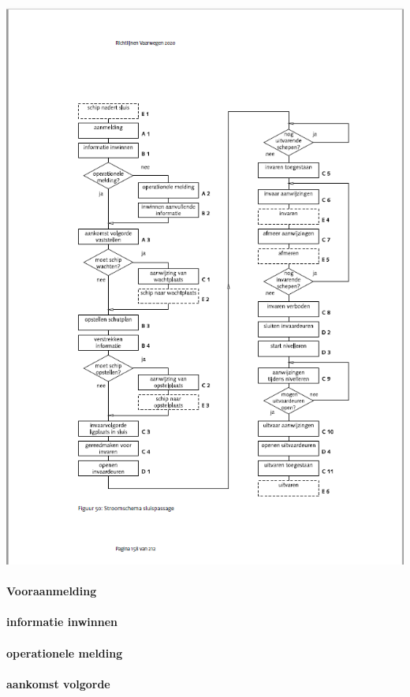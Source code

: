 \includegraphics[scale=0.65]{sluispassage.png}

\paragraph{Vooraanmelding}


\paragraph{informatie inwinnen}


\paragraph{operationele melding}


\paragraph{aankomst volgorde}

